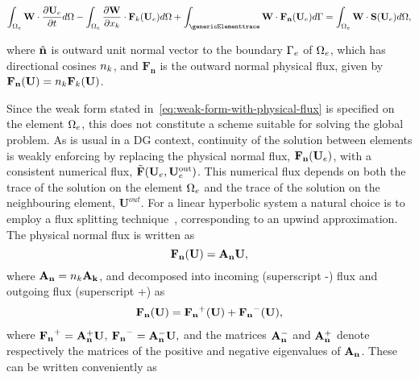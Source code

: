 \begin{equation}
\int_{\genericElement} \TF \cdot \uet \delem  - \int_{\genericElement} \dpart{\TF}{\xk} \cdot
\Flux_{k}(\Ue) \delem + \int_{\genericElementtrace} \TF \cdot \NormalFlux(\Ue) \delemtrace
= \int_{\genericElement} \TF \cdot \maxwellSource(\Ue) \delem,
\label{eq:weak-form-with-physical-flux}
\end{equation}

where $\hat{\mathbf{n}}$ is outward unit normal vector to the boundary $\Gamma_e$ of $\Omega_e$, which has directional cosines $n_{k}$, and $\mathbf{F_n}$ is the outward normal physical flux, given by $ \mathbf{F_n}(\mathbf{U}) = n_{k} \mathbf{F}_k(\mathbf{U}) $.

Since the weak form stated in~\eqref{eq:weak-form-with-physical-flux} is specified on the element $\Omega_e$, this does not constitute a scheme suitable for solving the global problem. As is usual in a DG context, continuity of the solution between elements is weakly enforcing by replacing the physical normal flux, $\mathbf{\mathbf{F}_n}(\mathbf{U}_e)$, with a consistent numerical flux, $\tilde{\mathbf{F}}(\mathbf{U}_e,\mathbf{U}_e^{\textrm{out}})$. This numerical flux depends on both the trace of the solution on the element $\Omega_e$ and the trace of the solution on the neighbouring element, $\mathbf{U}^{out}$.
For a linear hyperbolic system a natural choice is to employ a flux splitting technique~\cite{donea2003finite}, corresponding to an upwind approximation\cite{chen2005high}.
The physical normal flux is written as
$$
\mathbf{\mathbf{F}_n}(\mathbf{U}) = \mathbf{A}_\mathbf{n} \mathbf{U},
$$
where $\mathbf{A}_\mathbf{n} = n_{k} \mathbf{A}_\mathbf{k}$, and decomposed into incoming (superscript -) flux and outgoing flux (superscript +) as
\begin{align}
\mathbf{\mathbf{F}_n}(\mathbf{U}) = \mathbf{\mathbf{F}_n}^+(\mathbf{U}) + \mathbf{\mathbf{F}_n}^-(\mathbf{U}),
\label{eq:phys-flux-splitting}
\end{align}
where $ \mathbf{\mathbf{F}_n}^+ = \mathbf{A}_\mathbf{n}^{+} \mathbf{U}$, $\mathbf{\mathbf{F}_n}^- = \mathbf{A}_\mathbf{n}^{-} \mathbf{U}, $ and the matrices $\mathbf{A}_\mathbf{n}^{-}$ and $\mathbf{A}_\mathbf{n}^{+}$ denote respectively the matrices of the positive and negative eigenvalues of $\mathbf{A}_\mathbf{n}$. These can be written conveniently as
